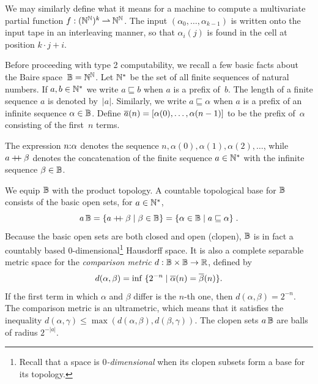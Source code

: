 We may similarly define what it means for a machine to compute a
multivariate partial function $f : (\mathbb{N}^{\mathbb{N}})^k \mathbin{\rightharpoonup} \mathbb{N}^{\mathbb{N}}$. The
input $(\alpha_0, \ldots, \alpha_{k-1})$ is written onto the input tape in
an interleaving manner, so that $\alpha_i(j)$ is found in the cell at
position $k \cdot j + i$.

Before proceeding with type 2 computability, we recall a few basic
facts about the Baire space~$\mathbb{B} = \mathbb{N}^{\mathbb{N}}$. Let $\mathbb{N}^{*}$ be the
set of all finite sequences of natural numbers. If $a, b \in \mathbb{N}^{*}$
we write $a \sqsubseteq b$ when $a$ is a prefix of~$b$. The length of
a finite sequence $a$ is denoted by~$|a|$. Similarly, we write $a
\sqsubseteq \alpha$ when $a$ is a prefix of an infinite sequence
$\alpha \in \mathbb{B}$. Define $\overline{a}(n) = [\alpha(0), \ldots,
\alpha(n-1)]$ to be the prefix of~$\alpha$ consisting of the
first~$n$ terms.

The expression $n {:} \alpha$ denotes the sequence $n, \alpha(0),
\alpha(1), \alpha(2), \ldots$, while $a \mathbin{{+}\!\!{+}} \beta$ denotes the
concatenation of the finite sequence $a \in \mathbb{N}^{*}$ with the infinite
sequence $\beta \in \mathbb{B}$.

We equip $\mathbb{B}$ with the product topology. A countable topological
base for $\mathbb{B}$ consists of the basic open sets, for $a \in
\mathbb{N}^{*}$,
%
\begin{equation*}
  a\,\mathbb{B}
  = \{a \mathbin{{+}\!\!{+}} \beta \mid \beta \in \mathbb{B}\}
  = \{\alpha \in \mathbb{B} \mid a \sqsubseteq \alpha\}
  \;.
\end{equation*}
%
Because the basic open sets are both closed and open (clopen),
$\mathbb{B}$ is in fact a countably based $0$-dimensional\footnote{Recall
  that a space is \emph{$0$-dimensional} when its clopen subsets form
  a base for its topology.} Hausdorff space. It is also a complete
separable metric space for the \emph{comparison metric} $d : \mathbb{B}
\times \mathbb{B} \to \mathbb{R}$, defined by
%
\begin{equation*}
  d(\alpha, \beta) = \inf \;\{2^{-n} \mid
    \overline{\alpha}(n) = \overline{\beta}(n)\}.
\end{equation*}
%
If the first term in which $\alpha$ and $\beta$ differ is the $n$-th
one, then $d(\alpha, \beta) = 2^{-n}$. The comparison metric is an
ultrametric, which means that it satisfies the inequality $d(\alpha,
\gamma) \leq \max(d(\alpha, \beta), d(\beta, \gamma))$. The clopen
sets $a\,\mathbb{B}$ are balls of radius $2^{-|a|}$.

